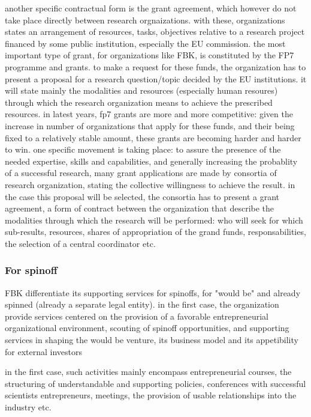 another specific contractual form is the grant agreement, which however do not take place directly between research orgnaizations. with these, organizations states an arrangement of resources, tasks, objectives relative to a research project financed by some public institution, especially the EU commission. the most important type of grant, for organizations like FBK, is constituted by the FP7 programme and grants. to make a request for these funds, the organization has to present a proposal for a research question/topic decided by the EU institutions. it will state mainly the modalities and resources (especially human resoures) through which the research organization means to achieve the prescribed resources. in latest years, fp7 grants are more and more competitive: given the increase in number of organizations that apply for these funds, and their being fixed to a relatively stable amount, these grants are becoming harder and harder to win. one specific movement is taking place: to assure the presence of the needed expertise, skills and capabilities, and generally increasing the probablity of a successful research, many grant applications are made by consortia of research organization, stating the collective willingness to achieve the result. in the case this proposal will be selected, the consortia has to present a grant agreement, a form of contract between the organization that describe the modalities through which the research will be performed: who will seek for which sub-results, resources, shares of appropriation of the grand funds, responsabilities, the selection of a central coordinator etc. 

\subsubsection{For spinoff}

FBK differentiate its supporting services for spinoffs, for "would be" and already spinned (already a separate legal entity). in the first case, the organization provide services centered on the provision of a favorable entrepreneurial organizational environment, scouting of spinoff opportunities, and supporting services in shaping the would be venture, its business model and its appetibility for external investors

in the first case, such activities mainly encompass entrepreneurial courses, the structuring of understandable and supporting policies, conferences with successful scientists entrepreneurs, meetings, the provision of usable relationships into the industry etc.

